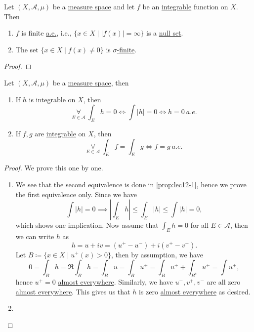 \begin{lemma}\label{lma:lec-13-2}
	Let \((X, \mathcal{A} , \mu )\) be a \hyperref[def:measure-space]{measure space} and let \(f\) be an \hyperref[def:integrable]{integrable} function on \(X\).
	Then
	\begin{enumerate}[(1)]
		\item \(f\) is finite \hyperref[def:mu-almost-everywhere]{a.e.}, i.e., \(\{x\in X \mid \left\vert f(x) \right\vert = \infty \}\) is a \hyperref[def:mu-null-set]{null set}.
		\item The set \(\{x\in X \mid f(x)\neq 0\}\) is \hyperref[def:finite-measure]{\(\sigma \)-finite}.
	\end{enumerate}
\end{lemma}
\begin{proof}
\end{proof}

\begin{proposition}\label{prop:lec-13}
	Let \((X, \mathcal{A} , \mu )\) be a \hyperref[def:measure-space]{measure space}, then
	\begin{enumerate}[(1)]
		\item If \(h\) is \hyperref[def:integrable]{integrable} on \(X\), then
		      \[
			      \underset{E\in \mathcal{A} }{\forall }\ \int_E h = 0 \iff \int \left\vert h \right\vert = 0 \iff h = 0\ \hyperref[def:mu-almost-everywhere]{a.e.}
		      \]
		\item If \(f, g\) are \hyperref[def:integrable]{integrable} on \(X\), then
		      \[
			      \underset{E\in \mathcal{A} }{\forall }\ \int _E f = \int _E g \iff f = g\ \hyperref[def:mu-almost-everywhere]{a.e.}
		      \]
	\end{enumerate}
\end{proposition}
\begin{proof}
	We prove this one by one.
	\begin{enumerate}[(1)]
		\item We see that the second equivalence is done in \autoref{prop:lec12-1}, hence we prove the first equivalence only.
		      Since we have
		      \[
			      \int \left\vert h \right\vert = 0 \implies \left\vert \int _E h \right\vert \leq \int _E \left\vert h \right\vert \leq \int \left\vert h \right\vert = 0,
		      \]
		      which shows one implication. Now assume that \(\int _E h = 0\) for all \(E\in \mathcal{A} \), then we can write \(h\) as
		      \[
			      h = u + iv = (u^+ - u^-) + i (v^+ - v^-).
		      \]
		      Let \(B\coloneqq \{x\in X \mid u^+(x)>0\}\), then by assumption, we have
		      \[
			      0 = \int _B h = \Re \int _B h = \int _B u = \int _B u^+ = \int _B u^+ + \int _{B^{c}} u^+ = \int u^+,
		      \]
		      hence \(u^+ = 0\) \hyperref[def:mu-almost-everywhere]{almost everywhere}. Similarly, we have \(u^-, v^+, v^-\) are all zero \hyperref[def:mu-almost-everywhere]{almost everywhere}.
		      This gives us that \(h\) is zero  \hyperref[def:mu-almost-everywhere]{almost everywhere} as desired.
		\item {}
	\end{enumerate}
\end{proof}


